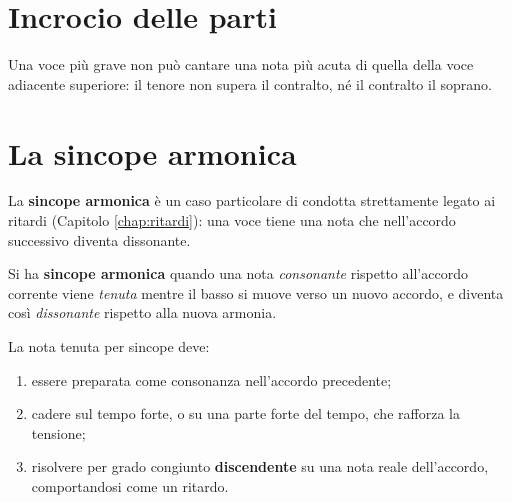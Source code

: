 \section{Incrocio delle parti}
\label{sec:incrocio_parti}

\begin{errore}
	\label{err:incrocio}
	Una voce più grave non può cantare una nota più acuta di quella della voce adiacente superiore: il tenore non supera il contralto, né il contralto il soprano.
\end{errore}

\section{La sincope armonica}
\label{sec:sincope_armonica}

La \textbf{sincope armonica} è un caso particolare di condotta strettamente legato ai ritardi (Capitolo \ref{chap:ritardi}): una voce tiene una nota che nell'accordo successivo diventa dissonante.

\begin{definizione}
	\label{def:sincope_armonica}
	Si ha \textbf{sincope armonica} quando una nota \textit{consonante} rispetto all'accordo corrente viene \textit{tenuta} mentre il basso si muove verso un nuovo accordo, e diventa così \textit{dissonante} rispetto alla nuova armonia.
\end{definizione}

\begin{regola}
	\label{reg:sincope_armonica}
	La nota tenuta per sincope deve:
	\begin{enumerate}
		\item essere preparata come consonanza nell'accordo precedente;
		\item cadere sul tempo forte, o su una parte forte del tempo, che rafforza la tensione;
		\item risolvere per grado congiunto \textbf{discendente} su una nota reale dell'accordo, comportandosi come un ritardo.
	\end{enumerate}
\end{regola}
